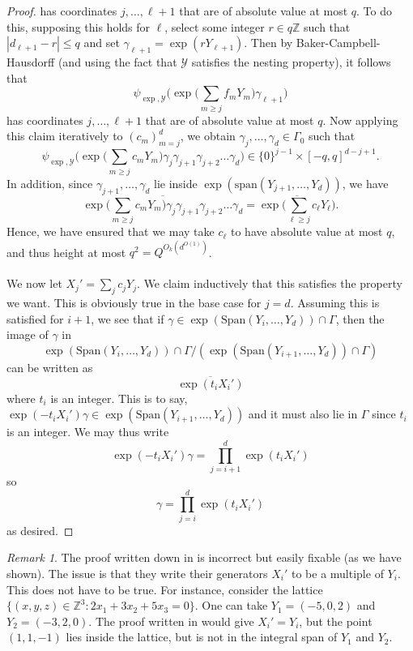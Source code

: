\documentclass[11pt, a4paper]{amsart}
\theoremstyle{plain}
\theoremstyle{plain}
\theoremstyle{definition}
\theoremstyle{remark}
\newtheorem*{remark}{Remark}
\numberwithin{equation}{section}
\numberwithin{lemma}{section}
\numberwithin{proposition}{section}
\numberwithin{corollary}{section}
\numberwithin{definition}{section}
\numberwithin{claim}{section}
\begin{document}
\begin{proof}
has coordinates $j, \dots, \ell+1$ that are of absolute value at most $q$. To do this, supposing this holds for $\ell$, select some integer $r \in q\mathbb{Z}$ such that $|d_{\ell + 1} - r| \le q$ and set $\gamma_{\ell + 1} = \exp(rY_{\ell + 1})$. Then by Baker-Campbell-Hausdorff (and using the fact that $\mathcal{Y}$ satisfies the nesting property), it follows that
$$\psi_{\exp, \mathcal{Y}}\big(\exp\big(\sum_{m \ge j} f_m Y_m\big) \gamma_{\ell + 1}\big)$$
has coordinates $j, \dots, \ell + 1$ that are of absolute value at most $q$. Now applying this claim iteratively to $(c_m)_{m = j}^d$, we obtain $\gamma_j, \dots, \gamma_d \in \Gamma_0$ such that 
$$\psi_{\exp, \mathcal{Y}}\big(\exp\big(\sum_{m \ge j} c_m Y_m\big)\gamma_j\gamma_{j + 1} \gamma_{j + 2} \dots \gamma_d\big) \in \{0\}^{j - 1} \times [-q, q]^{d - j + 1}.$$
In addition, since $\gamma_{j + 1}, \dots, \gamma_d$ lie inside $\exp(\text{span}(Y_{j + 1}, \dots, Y_d))$, we have
$$\overline{\exp\big(\sum_{m \ge j} c_m Y_m\big)\gamma_j\gamma_{j + 1} \gamma_{j + 2} \dots \gamma_d} = \overline{\exp\big(\sum_{\ell \ge j} c_\ell Y_\ell\big)}.$$
Hence, we have ensured that we may take $c_\ell$ to have absolute value at most $q$, and thus height at most $q^2 = Q^{O_k(d^{O(1)})}$. \\\\
We now let $X_j' = \sum_j c_j Y_j$. We claim inductively that this satisfies the property we want. This is obviously true in the base case for $j = d$. Assuming this is satisfied for $i + 1$, we see that if $\gamma \in \exp(\text{Span}(Y_{i}, \dots, Y_d)) \cap \Gamma$, then the image of $\gamma$ in 
$$\exp(\text{Span}(Y_i, \dots, Y_d)) \cap \Gamma / (\exp(\text{Span}(Y_{i + 1}, \dots, Y_d)) \cap \Gamma)$$
can be written as
$$\overline{\exp(t_i X_i')}$$
where $t_i$ is an integer. This is to say, $\exp(-t_iX_i')\gamma \in \exp(\text{Span}(Y_{i + 1}, \dots, Y_d))$ and it must also lie in $\Gamma$ since $t_i$ is an integer. We may thus write
$$ \exp(-t_iX_i')\gamma = \prod_{j = i + 1}^d \exp(t_i X_i')$$
so
$$\gamma = \prod_{j = i}^d \exp(t_i X_i')$$
as desired.
\end{proof}
\begin{remark}
The proof written down in \cite[Proposition A.9]{GT12} is incorrect but easily fixable (as we have shown). The issue is that they write their generators $X_i'$ to be a multiple of $Y_i$. This does not have to be true. For instance, consider the lattice $\{(x, y, z) \in \mathbb{Z}^3: 2x_1 + 3x_2 + 5x_3 = 0\}$. One can take $Y_1 = (-5, 0, 2)$ and $Y_2 = (-3, 2, 0)$. The proof written in \cite[Proposition A.9]{GT12} would give $X_i' = Y_i$, but the point $(1, 1, -1)$ lies inside the lattice, but is not in the integral span of $Y_1$ and $Y_2$.
\end{remark}
\end{document}
